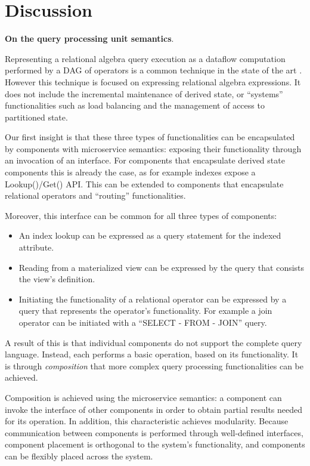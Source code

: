 
\section{Discussion}

\noindent
\textbf{On the query processing unit semantics}.

\noindent
Representing a relational algebra query execution as a dataflow computation performed by a DAG of operators is a common
technique in the state of the art \cite{cockroachdb:distsql}.
However this technique is focused on expressing relational algebra expressions.
It does not include the incremental maintenance of derived state, or ``systems'' functionalities such as load balancing
and the management of access to partitioned state.

Our first insight is that these three types of functionalities can be encapsulated by components with microservice semantics:
exposing their functionality through an invocation of an interface.
For components that encapsulate derived state components this is already the case, as for example indexes expose a
Lookup()/Get() API.
This can be extended to components that encapsulate relational operators and ``routing'' functionalities.

Moreover, this interface can be common for all three types of components:
\begin{itemize}
  \item An index lookup can be expressed as a query statement for the indexed attribute.
  \item Reading from a materialized view can be expressed by the query that consists the view's definition.
  \item Initiating the functionality of a relational operator can be expressed by a query that represents the
  operator's functionality.
  For example a join operator can be initiated with a ``SELECT - FROM - JOIN'' query.
\end{itemize}

A result of this is that  individual components do not support the complete query language.
Instead, each performs a basic operation, based on its functionality.
It is through \textit{composition} that more complex query processing functionalities can be achieved.

Composition is achieved using the microservice semantics:
a component can invoke the interface of other components in order to obtain partial results needed for its operation.
In addition, this characteristic achieves modularity.
Because communication between components is performed through well-defined interfaces,
component placement is orthogonal to the system's functionality, and components can be flexibly placed across the system.

